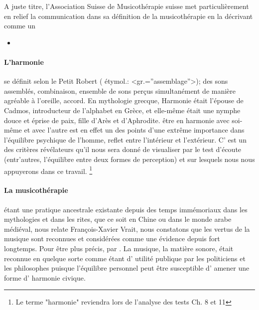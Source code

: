 	 
A juste titre, l'Association Suisse de Musicothérapie suisse met particulièrement en relief 
la communication dans sa définition de la musicothérapie en la décrivant comme un
 
\begin{itemize}
\item {}
\end {itemize}

 \paragraph{L'harmonie} se définit selon le Petit Robert ( étymol.:
 <gr.=''assemblage''>);
 des sons assemblés, combinaison, ensemble de sons perçus
 simultanément de manière agréable à l'oreille, accord.
 En mythologie grecque, Harmonie était l'épouse de Cadmos,
 introducteur de l'alphabet en Grèce, et elle-même était une nymphe
 douce et éprise de paix, fille d'Arès et d'Aphrodite. 
être en harmonie avec soi-même et avec l'autre est en effet un des
points 
d'une extrême importance dans l'équilibre psychique de l'homme, reflet
entre  l'intérieur et l'extérieur. C' est un des  
critères révélateurs qu'il nous sera donné de visualiser par le test
d'écoute (entr'autres, l'équilibre entre deux formes de perception) et sur
lesquels 
nous nous appuyerons  
dans ce travail.  \footnote{Le terme "harmonie" reviendra lors de
  l'analyse des tests Ch. 8 et 11}

 \paragraph{La musicothérapie} étant une pratique ancestrale existante depuis des
temps immémoriaux dans les mythologies et dans les rites, que ce soit en Chine ou dans le monde arabe 
médiéval, nous relate François-Xavier Vrait, nous constatons que	 
les vertus de la musique sont reconnues et considérées comme une évidence depuis 
fort longtemps. Pour être plus précis, par  
  \autocite[ch. III, p. 
96]{vrait_musicotherapie_2018}.
La musique, la matière sonore, était reconnue en quelque sorte comme étant d' utilité
publique
par les  politiciens  et les philosophes puisque l'équilibre personnel
peut être susceptible d'
amener une forme d' harmonie civique.

